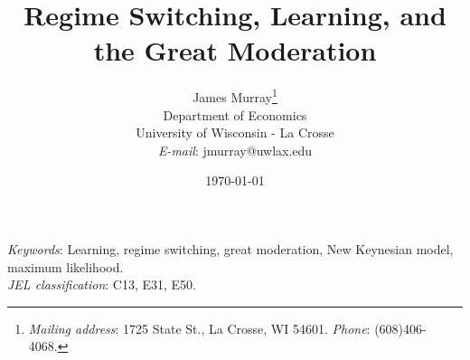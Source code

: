 \documentclass[12pt]{article}
\begin{document}
\begin{titlepage}
\begin{singlespace}
\title{Regime Switching, Learning, and the Great Moderation}
\date{\today}
\author{
James Murray\footnote{\textit{Mailing address}: 1725 State St., La Crosse, WI  54601. \textit{Phone}: (608)406-4068.}\\Department of Economics\\University of Wisconsin - La Crosse\\\textit{E-mail}: jmurray@uwlax.edu
}

\maketitle

\thispagestyle{empty}

\abstract{} \newline  

\noindent \textit{Keywords}: Learning, regime switching, great moderation, New Keynesian model, maximum likelihood. \\
\noindent \textit{JEL classification}: C13, E31, E50.
\end{singlespace}
\end{titlepage}
\newpage


\newpage

\newpage

\end{document}
